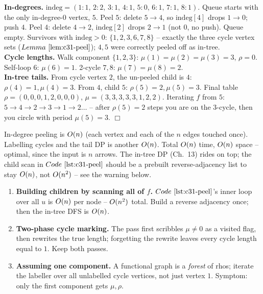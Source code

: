 \begin{tracebox}
\textbf{In-degrees.} \(\mathrm{indeg}=(1{:}1,\,2{:}2,\,3{:}1,\,4{:}1,\,5{:}0,\,6{:}1,\,7{:}1,\,8{:}1)\).
Queue starts with the only in-degree-\(0\) vertex, \(5\).  Peel \(5\): delete \(5{\to}4\), so
\(\mathrm{indeg}[4]\) drops \(1\to0\); push \(4\).  Peel \(4\): delete \(4{\to}2\),
\(\mathrm{indeg}[2]\) drops \(2\to1\) (not \(0\), no push).  Queue empty.  Survivors with
\(\mathrm{indeg}>0\): \(\{1,2,3,6,7,8\}\) -- exactly the three cycle vertex sets
(\(\lemref{c31-peel}\)); \(4,5\) were correctly peeled off as in-tree.\\
\textbf{Cycle lengths.} Walk component \(\{1,2,3\}\): \(\mu(1)=\mu(2)=\mu(3)=3\),
\(\rho=0\).  Self-loop \(6\): \(\mu(6)=1\).  2-cycle \(7,8\): \(\mu(7)=\mu(8)=2\).\\
\textbf{In-tree tails.} From cycle vertex \(2\), the un-peeled child is \(4\):
\(\rho(4)=1,\mu(4)=3\).  From \(4\), child \(5\): \(\rho(5)=2,\mu(5)=3\).  Final table
\(\rho=(0,0,0,1,2,0,0,0)\), \(\mu=(3,3,3,3,3,1,2,2)\).  Iterating \(f\) from \(5\):
\(5{\to}4{\to}2{\to}3{\to}1{\to}2\ldots\) -- after \(\rho(5)=2\) steps you are on the
3-cycle, then you circle with period \(\mu(5)=3\). \(\Box\)
\end{tracebox}

\begin{complexitybox}
In-degree peeling is \(O(n)\) (each vertex and each of the \(n\) edges touched once).
Labelling cycles and the tail DP is another \(O(n)\).  Total \(O(n)\) time, \(O(n)\)
space -- optimal, since the input is \(n\) arrows.  The in-tree DP (Ch.~13) rides on top;
the  child scan in \(\coderef{c31-peel}\) should be a prebuilt
reverse-adjacency list to stay \(O(n)\), not \(O(n^2)\) -- see the warning below.
\end{complexitybox}

\begin{warningbox}
\begin{enumerate}[nosep,leftmargin=1.6em]
  \item \textbf{Building children by scanning all of \(f\).} \(\coderef{c31-peel}\)'s
         inner loop  over all \(u\) is \(O(n)\) per
        node -- \(O(n^2)\) total.  Build a reverse adjacency
         once; then the in-tree DFS is \(O(n)\).
  \item \textbf{Two-phase cycle marking.} The  pass first scribbles
        \(\mu{\neq}0\) as a visited flag, then rewrites the true length; forgetting the
        rewrite leaves every cycle length equal to \(1\).  Keep both passes.
  \item \textbf{Assuming one component.} A functional graph is a \emph{forest} of
        rhos; iterate the labeller over all unlabelled cycle vertices, not just vertex
        \(1\).  Symptom: only the first component gets \(\mu,\rho\).
\end{enumerate}
\end{warningbox}


